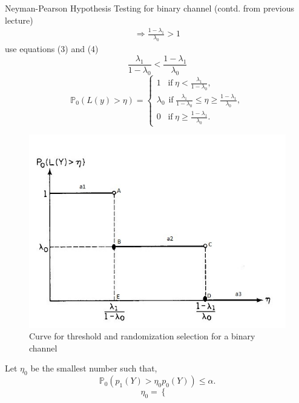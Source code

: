 \documentclass[a4paper,english,12pt]{article}
\begin{document}
\begin{exmp}{Neyman-Pearson Hypothesis Testing for binary channel (contd. from previous lecture)}
\begin{eqnarray}
&\Rightarrow \frac{1-\lambda_1}{\lambda_0} > 1&
\end{eqnarray}
use equations (3) and (4) 
\begin{equation}
\frac{\lambda_1}{1-\lambda_0} < \frac{1-\lambda_1}{\lambda_0}
\end{equation}
\begin{equation}
\mathbb{P}_0 (L(y) > \eta)=\begin{cases}
1\hspace{10pt}\mbox{if}\hspace{3pt}\eta< \frac{\lambda_1}{1-\lambda_0},\\ 
\lambda_0\hspace{5pt}\mbox{if}\hspace{3pt}\frac{\lambda_1}{1-\lambda_0} \leq \eta \geq \frac{1-\lambda_1}{\lambda_0},\\
0\hspace{10pt}\mbox{if}\hspace{3pt}\eta \geq  \frac{1-\lambda_1}{\lambda_0}.
\end{cases}
\end{equation}
\begin{figure}[t]
\centering
\includegraphics[scale=0.8]{Figures/img.jpg} 
\caption{Curve for threshold and randomization selection for a binary channel}
\end{figure}
Let $\eta_0$ be the smallest number such that,
\begin{equation}
\mathbb{P}_0(p_1(Y) > \eta_0 p_0(Y)) \leq \alpha.
\end{equation}
\begin{equation}
\eta_0 =\begin{cases}

\end{cases}
\end{equation}
\end{exmp}
\end{document}
